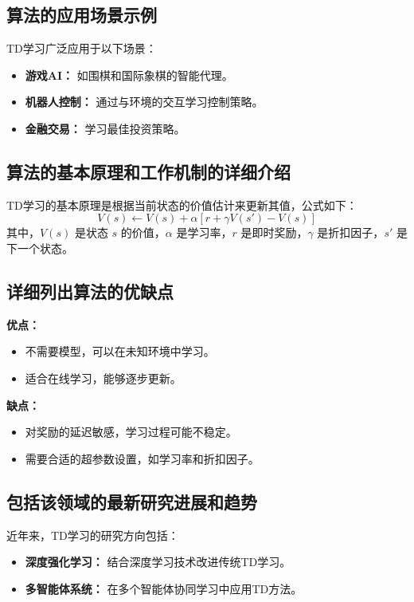 \subsection*{算法的应用场景示例}
TD学习广泛应用于以下场景：
\begin{itemize}
    \item \textbf{游戏AI：} 如围棋和国际象棋的智能代理。
    \item \textbf{机器人控制：} 通过与环境的交互学习控制策略。
    \item \textbf{金融交易：} 学习最佳投资策略。
\end{itemize}

\subsection*{算法的基本原理和工作机制的详细介绍}
TD学习的基本原理是根据当前状态的价值估计来更新其值，公式如下：
\[
    V(s) \leftarrow V(s) + \alpha [r + \gamma V(s') - V(s)]
\]
其中，\(V(s)\) 是状态 \(s\) 的价值，\(\alpha\) 是学习率，\(r\) 是即时奖励，\(\gamma\) 是折扣因子，\(s'\) 是下一个状态。

\subsection*{详细列出算法的优缺点}
\textbf{优点：}
\begin{itemize}
    \item 不需要模型，可以在未知环境中学习。
    \item 适合在线学习，能够逐步更新。
\end{itemize}

\textbf{缺点：}
\begin{itemize}
    \item 对奖励的延迟敏感，学习过程可能不稳定。
    \item 需要合适的超参数设置，如学习率和折扣因子。
\end{itemize}

\subsection*{包括该领域的最新研究进展和趋势}
近年来，TD学习的研究方向包括：
\begin{itemize}
    \item \textbf{深度强化学习：} 结合深度学习技术改进传统TD学习。
    \item \textbf{多智能体系统：} 在多个智能体协同学习中应用TD方法。
\end{itemize}
